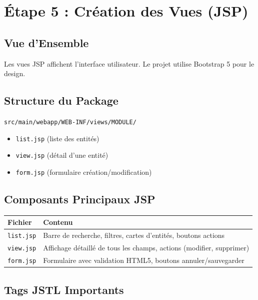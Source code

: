\documentclass[12pt,a4paper]{article}
\begin{document}
\newpage

\section{Étape 5 : Création des Vues (JSP)}

\subsection{Vue d'Ensemble}

Les vues JSP affichent l'interface utilisateur. Le projet utilise Bootstrap 5 pour le design.

\subsection{Structure du Package}

\begin{tcolorbox}[colback=gray!10]
\texttt{src/main/webapp/WEB-INF/views/MODULE/}
\begin{itemize}
    \item \texttt{list.jsp} (liste des entités)
    \item \texttt{view.jsp} (détail d'une entité)
    \item \texttt{form.jsp} (formulaire création/modification)
\end{itemize}
\end{tcolorbox}

\subsection{Composants Principaux JSP}

\begin{center}
\begin{tabular}{|l|p{10cm}|}
\hline
\textbf{Fichier} & \textbf{Contenu} \\
\hline
\texttt{list.jsp} & Barre de recherche, filtres, cartes d'entités, boutons actions \\
\hline
\texttt{view.jsp} & Affichage détaillé de tous les champs, actions (modifier, supprimer) \\
\hline
\texttt{form.jsp} & Formulaire avec validation HTML5, boutons annuler/sauvegarder \\
\hline
\end{tabular}
\end{center}

\subsection{Tags JSTL Importants}
\end{document}
